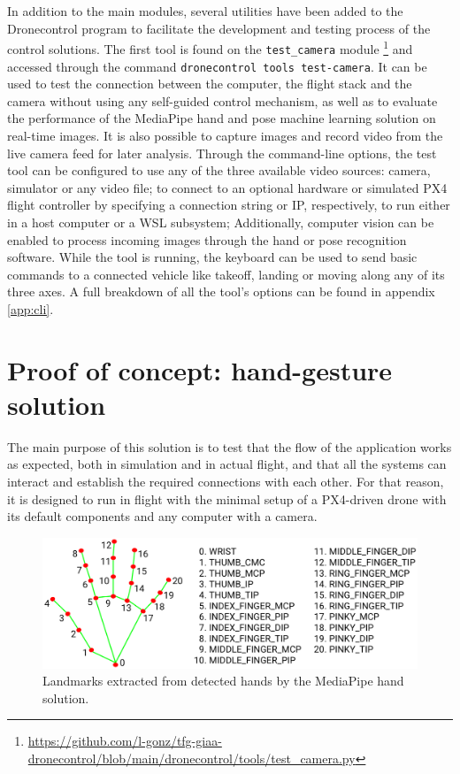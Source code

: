 In addition to the main modules, several utilities have been added to the Dronecontrol program to facilitate the development and testing process of the control solutions.
The first tool is found on the \texttt{test\_camera} module \footnote{\url{https://github.com/l-gonz/tfg-giaa-dronecontrol/blob/main/dronecontrol/tools/test_camera.py}} and accessed through the command \texttt{dronecontrol tools test-camera}.
It can be used to test the connection between the computer, the flight stack and the camera without using any self-guided control mechanism, as well as to evaluate the performance of the MediaPipe hand and pose machine learning solution on real-time images.
It is also possible to capture images and record video from the live camera feed for later analysis.
Through the command-line options, the test tool can be configured to use any of the three available video sources: camera, simulator or any video file; to connect to an optional hardware or simulated PX4 flight controller by specifying a connection string or IP, respectively,
to run either in a host computer or a WSL subsystem;
Additionally, computer vision can be enabled to process incoming images through the hand or pose recognition software.
While the tool is running, the keyboard can be used to send basic commands to a connected vehicle like takeoff, landing or moving along any of its three axes.
A full breakdown of all the tool's options can be found in appendix \ref{app:cli}.


\section{Proof of concept: hand-gesture solution}
\label{sec:hands}
The main purpose of this solution is to test that the flow of the application works as expected, both in simulation and in actual flight, and that all the systems can interact and establish the required connections with each other.
For that reason, it is designed to run in flight with the minimal setup of a PX4-driven drone with its default components and any computer with a camera.

\begin{figure}
  \centering
  \includegraphics[width=\textwidth, keepaspectratio]{img/hand_landmarks.png}
  \caption{Landmarks extracted from detected hands by the MediaPipe hand solution.}
  \label{fig:hand-landmarks}
\end{figure}

